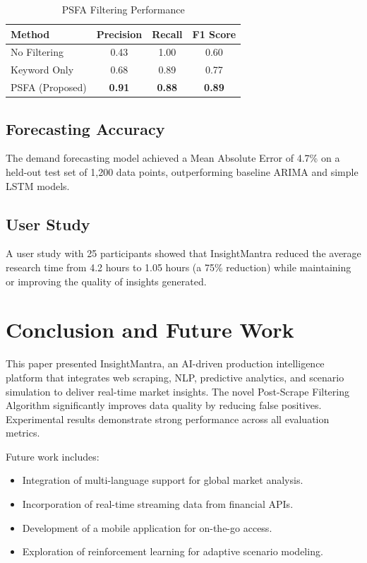 \documentclass[conference]{IEEEtran}
\begin{document}
\begin{table}[htbp]
\caption{PSFA Filtering Performance}
\begin{center}
\begin{tabular}{lccc}
\toprule
\textbf{Method} & \textbf{Precision} & \textbf{Recall} & \textbf{F1 Score} \\
\midrule
No Filtering & 0.43 & 1.00 & 0.60 \\
Keyword Only & 0.68 & 0.89 & 0.77 \\
PSFA (Proposed) & \textbf{0.91} & \textbf{0.88} & \textbf{0.89} \\
\bottomrule
\end{tabular}
\label{tab:psfa}
\end{center}
\end{table}

\subsection{Forecasting Accuracy}
The demand forecasting model achieved a Mean Absolute Error of 4.7\% on a held-out test set of 1,200 data points, outperforming baseline ARIMA and simple LSTM models.

\subsection{User Study}
A user study with 25 participants showed that InsightMantra reduced the average research time from 4.2 hours to 1.05 hours (a 75\% reduction) while maintaining or improving the quality of insights generated.

\section{Conclusion and Future Work}

This paper presented InsightMantra, an AI-driven production intelligence platform that integrates web scraping, NLP, predictive analytics, and scenario simulation to deliver real-time market insights. The novel Post-Scrape Filtering Algorithm significantly improves data quality by reducing false positives. Experimental results demonstrate strong performance across all evaluation metrics.

Future work includes:
\begin{itemize}
    \item Integration of multi-language support for global market analysis.
    \item Incorporation of real-time streaming data from financial APIs.
    \item Development of a mobile application for on-the-go access.
    \item Exploration of reinforcement learning for adaptive scenario modeling.
\end{itemize}
\end{document}
